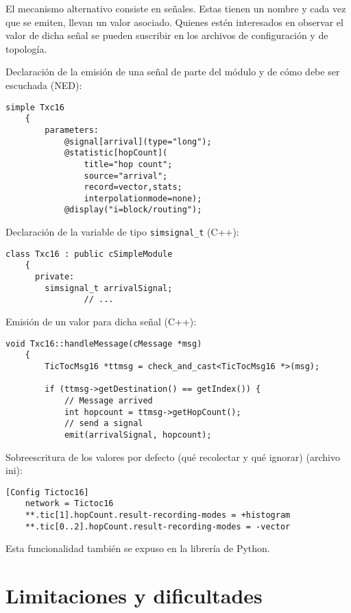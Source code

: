 El mecanismo alternativo consiste en señales. Estas tienen un nombre y cada vez
que se emiten, llevan un valor asociado. Quienes estén interesados en observar
el valor de dicha señal se pueden suscribir en los archivos de configuración y
de topología.

Declaración de la emisión de una señal de parte del módulo y de cómo debe ser
escuchada (NED):

\begin{verbatim}
simple Txc16
    {
        parameters:
            @signal[arrival](type="long");
            @statistic[hopCount](
                title="hop count";
                source="arrival";
                record=vector,stats;
                interpolationmode=none);
            @display("i=block/routing");
\end{verbatim}

Declaración de la variable de tipo \verb!simsignal_t! (C++):

\begin{verbatim}
class Txc16 : public cSimpleModule
    {
      private:
        simsignal_t arrivalSignal;
                // ...
\end{verbatim}

Emisión de un valor para dicha señal (C++):

\begin{verbatim}
void Txc16::handleMessage(cMessage *msg)
    {
        TicTocMsg16 *ttmsg = check_and_cast<TicTocMsg16 *>(msg);
    
        if (ttmsg->getDestination() == getIndex()) {
            // Message arrived
            int hopcount = ttmsg->getHopCount();
            // send a signal
            emit(arrivalSignal, hopcount);
\end{verbatim}

Sobreescritura de los valores por defecto (qué recolectar y qué ignorar)
(archivo ini):

\begin{verbatim}
[Config Tictoc16]
    network = Tictoc16
    **.tic[1].hopCount.result-recording-modes = +histogram
    **.tic[0..2].hopCount.result-recording-modes = -vector
\end{verbatim}

Esta funcionalidad también se expuso en la librería de Python.

\section{Limitaciones y dificultades}\label{subsec:lim}

